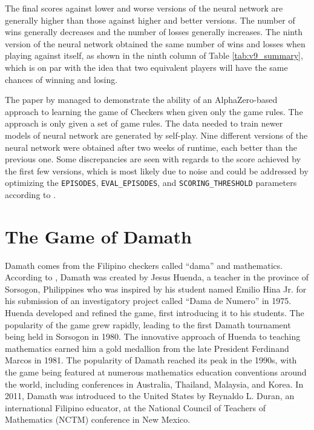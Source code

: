 The final scores against lower and worse versions of the neural network are generally higher than those against higher and better versions. The number of wins generally decreases and the number of losses generally increases. The ninth version of the neural network obtained the same number of wins and losses when playing against itself, as shown in the ninth column of Table \ref{tab:v9_summary}, which is on par with the idea that two equivalent players will have the same chances of winning and losing.

The paper by \cite{Popic_Boskovic_Brest_2021} managed to demonstrate the ability of an AlphaZero-based approach to learning the game of Checkers when given only the game rules. The approach is only given a set of game rules. The data needed to train newer models of neural network are generated by self-play. Nine different versions of the neural network were obtained after two weeks of runtime, each better than the previous one. Some discrepancies are seen with regards to the score achieved by the ﬁrst few versions, which is most likely due to noise and could be addressed by optimizing the \verb|EPISODES|, \verb|EVAL_EPISODES|, and \verb|SCORING_THRESHOLD| parameters according to \cite{Popic_Boskovic_Brest_2021}.


\section{The Game of Damath}

Damath comes from the Filipino checkers called ``dama'' and mathematics. According to \cite{MathleteSociety2024}, Damath was created by Jesus Huenda, a teacher in the province of Sorsogon, Philippines who was inspired by his student named Emilio Hina Jr. for his submission of an investigatory project called ``Dama de Numero'' in 1975. Huenda developed and refined the game, first introducing it to his students. The popularity of the game grew rapidly, leading to the first Damath tournament being held in Sorsogon in 1980.  The innovative approach of Huenda to teaching mathematics earned him a gold medallion from the late President Ferdinand Marcos in 1981. The popularity of Damath reached its peak in the 1990s, with the game being featured at numerous mathematics education conventions around the world, including conferences in Australia, Thailand, Malaysia, and Korea. In 2011, Damath was introduced to the United States by Reynaldo L. Duran, an international Filipino educator, at the National Council of Teachers of Mathematics (NCTM) conference in New Mexico.

